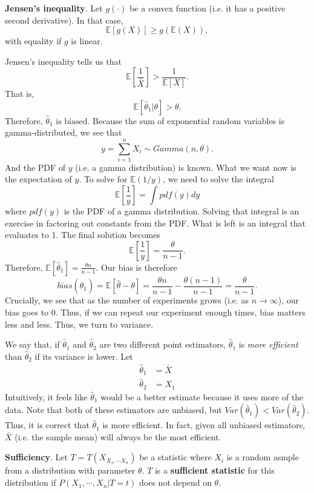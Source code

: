 \documentclass[titlepage, 12pt, leqno]{article}
\begin{document}
\begin{definition}
    \textbf{Jensen's inequality}. Let $g(\cdot)$ be a convex function (i.e. it
    has a positive second derivative). In that case,
    \[
        \mathbb{E}[g(X)] \ge g(\mathbb{E}(X)),
    \]
    with equality if $g$ is linear.
\end{definition}

Jensen's inequality tells us that
\[
    \mathbb{E}\left[\frac{1}{\bar X}\right] > \frac{1}{\mathbb{E}[X]}.
\]
That is,
\[
    \mathbb{E}[\hat \theta_{1}|\theta] > \theta.
\]
Therefore, $\boxed{ \text{$\hat \theta_{1}$ is biased}}$. Because the sum of
exponential random variables is gamma-distributed, we see that
\[
y = \sum_{i=1}^{n}X_{i} \sim Gamma(n, \theta).
\]
And the PDF of $y$ (i.e. a gamma distribution) is known. What we want now is
the expectation of $y$. To solve for $\mathbb{E}(1/y)$, we need to solve the
integral
\[
    \mathbb{E}\left[\frac{1}{y}\right] = \int pdf(y)dy
\]
where $pdf(y)$ is the PDF of a gamma distribution. Solving that integral is an
exercise in factoring out constants from the PDF. What is left is an integral
that evaluates to 1. The final solution becomes
\[
    \mathbb{E}\left[\frac{1}{y}\right] = \frac{\theta}{n-1}.
\]
Therefore, $\mathbb{E}[\hat \theta_{1}] = \frac{\theta n}{n-1}$. Our bias is
therefore
\[
    bias(\hat \theta_{1})=\mathbb{E}[\hat \theta-\theta] =\frac{\theta n}{n-1} - 
    \frac{\theta(n-1)}{n-1} = \boxed{\frac{\theta}{n-1}}.
\]
Crucially, we see that as the number of experiments grows (i.e. as 
 $n \rightarrow \infty$), our bias goes to 0. Thus, if we can repeat our
 experiment enough times, bias matters less and less. Thus, we turn to variance.

We say that, if $\hat \theta_{1}$ and $\hat \theta_{2}$ are two different point
estimators, $\hat \theta_{1}$ is \textit{more efficient} than
 $\hat \theta_{2}$ if its variance is lower. Let
\begin{align*}
    \hat \theta_{1} &= \bar X \\
    \hat \theta_{2} &= X_{1}
\end{align*}
Intuitively, it feels like $\hat \theta_{1}$ would be a better estimate because
it uses more of the data. Note that both of these estimators are unbiased, but
$Var(\hat \theta_{1}) < Var(\hat \theta_{2})$. Thus, it is correct that
$\hat \theta_{1}$ is more efficient. In fact, given all unbiased estimators,
$\bar X$ (i.e. the sample mean) will always be the most efficient.

\begin{definition}
    \textbf{Sufficiency}. Let $T = T(X_{X_{1}, \cdots X_{n}})$ be a statistic
    where $X_{i}$ is a random asmple from a distribution with parameter
    $\theta$. $T$ is a \textbf{sufficient statistic} for this distribution
    if $P(X_{1}, \cdots , X_{n} | T = t)$ does not depend on $\theta$.
\end{definition}
\end{document}
